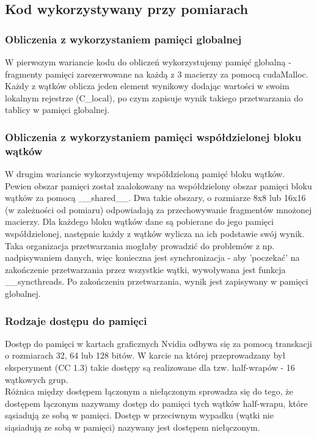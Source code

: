 \documentclass[10pt,a4paper]{article}
\begin{document}
\subsection{Kod wykorzystywany przy pomiarach}
\subsubsection*{Obliczenia z wykorzystaniem pamięci globalnej}
W pierwszym wariancie kodu do obliczeń wykorzystujemy pamięć globalną - fragmenty
pamięci zarezerwowane na każdą z 3 macierzy za pomocą cudaMalloc. Każdy z wątków
oblicza jeden element wynikowy dodając wartości w swoim lokalnym rejestrze (C\_local),
po czym zapisuje wynik takiego przetwarzania do tablicy w pamięci globalnej.

\subsubsection*{Obliczenia z wykorzystaniem pamięci współdzielonej bloku wątków}
W drugim wariancie wykorzystujemy współdzieloną pamięć bloku wątków. Pewien obszar
pamięci został zaalokowany na współdzielony obszar pamięci bloku wątków za pomocą
\_\_shared\_\_. Dwa takie obszary, o rozmiarze 8x8 lub 16x16 (w zależności od pomiaru)
odpowiadają za przechowywanie fragmentów mnożonej macierzy. Dla każdego bloku wątków
dane są pobierane do jego pamięci współdzielonej, następnie każdy z wątków wylicza
na ich podstawie swój wynik. \\
Taka organizacja przetwarzania mogłaby prowadzić do problemów z np. nadpisywaniem danych,
więc konieczna jest synchronizacja - aby 'poczekać' na zakończenie przetwarzania przez wszystkie wątki, wywoływana
jest funkcja \_\_syncthreads. Po zakończeniu przetwarzania, wynik jest zapisywany w
pamięci globalnej.


\subsubsection{Rodzaje dostępu do pamięci}
Dostęp do pamięci w kartach graficznych Nvidia odbywa się za pomocą transkacji o rozmiarach
32, 64 lub 128 bitów. W karcie na której przeprowadzany był eksperyment (CC 1.3) takie dostępy
są realizowane dla tzw. half-wrapów - 16 wątkowych grup. \\
Różnica między dostępem łączonym a niełączonym sprowadza się do tego, że
dostępem łączonym nazywamy dostęp do pamięci tych wątków half-wrapu, które
sąsiadują ze sobą w pamięci. Dostęp w przeciwnym wypadku (wątki nie siąsiadują ze sobą
w pamięci) nazywany jest dostępem niełączonym.
\end{document}
